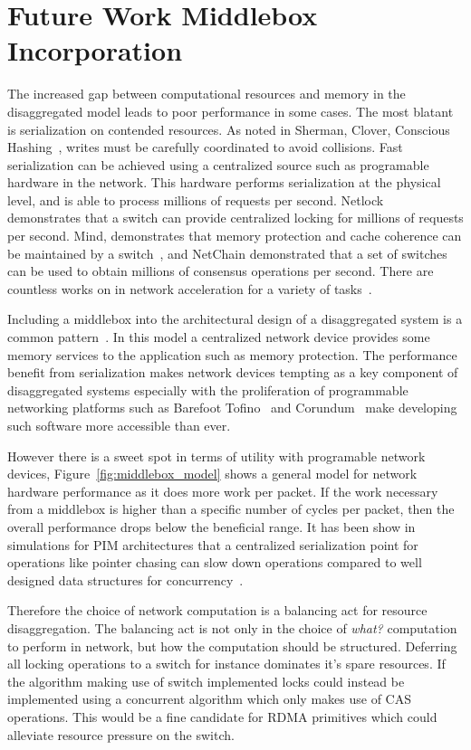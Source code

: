 \section{Future Work Middlebox Incorporation}

The increased gap between computational resources and memory in the
disaggregated model leads to poor performance in some cases. The most blatant is
serialization on contended resources. As noted in Sherman, Clover, Conscious
Hashing~\cite{sherman,clover,one-sided-hash}, writes must be carefully
coordinated to avoid collisions. Fast serialization can be achieved using a
centralized source such as programable hardware in the network. This hardware
performs serialization at the physical level, and is able to process millions of
requests per second. Netlock~\cite{netlock} demonstrates that a switch can
provide centralized locking for millions of requests per second. Mind,
demonstrates that memory protection and cache coherence can be maintained by a
switch~\cite{mind}, and NetChain demonstrated that a set of switches can be used
to obtain millions of consensus operations per second. There are countless works
on in network acceleration for a variety of tasks~.

Including a middlebox into the architectural design of a disaggregated system is
a common pattern~\cite{disandapp}. In this model a centralized network device
provides some memory services to the application such as memory protection. The
performance benefit from serialization makes network devices tempting as a key
component of disaggregated systems especially with the proliferation of
programmable networking platforms such as Barefoot Tofino~\cite{tofino3} and
Corundum~\cite{corundum} make developing such software more accessible than ever.

However there is a sweet spot in terms of utility with programable network
devices, Figure~\ref{fig:middlebox_model} shows a general model for network hardware
performance as it does more work per packet. If the work necessary from a
middlebox is higher than a specific number of cycles per packet, then the
overall performance drops below the beneficial range. It has been show in
simulations for PIM architectures that a centralized serialization point for
operations like pointer chasing can slow down operations compared to well
designed data structures for concurrency~.

Therefore the choice of network computation is a balancing act for resource
disaggregation. The balancing act is not only in the choice of \textit{what?}
computation to perform in network, but how the computation should be structured.
Deferring all locking operations to a switch for instance dominates it's spare
resources. If the algorithm making use of switch implemented locks could instead
be implemented using a concurrent algorithm which only makes use of CAS
operations. This would be a fine candidate for RDMA primitives which could
alleviate resource pressure on the switch.

